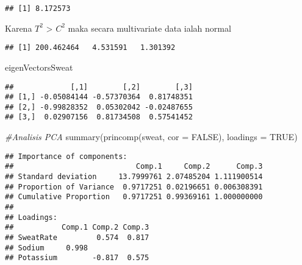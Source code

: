 \documentclass[
]{article}
\newenvironment{Shaded}{\begin{snugshade}}{\end{snugshade}}
\newcommand{\AttributeTok}[1]{\textcolor[rgb]{0.77,0.63,0.00}{#1}}
\newcommand{\CommentTok}[1]{\textcolor[rgb]{0.56,0.35,0.01}{\textit{#1}}}
\newcommand{\ConstantTok}[1]{\textcolor[rgb]{0.00,0.00,0.00}{#1}}
\newcommand{\FunctionTok}[1]{\textcolor[rgb]{0.00,0.00,0.00}{#1}}
\newcommand{\NormalTok}[1]{#1}
\newcommand{\OtherTok}[1]{\textcolor[rgb]{0.56,0.35,0.01}{#1}}
\newcommand{\SpecialCharTok}[1]{\textcolor[rgb]{0.00,0.00,0.00}{#1}}
\begin{document}
\begin{verbatim}
## [1] 8.172573
\end{verbatim}

Karena \(T^{2}\) \textgreater{} \(C^{2}\) maka secara multivariate data
ialah normal

\begin{Shaded}
\end{Shaded}

\begin{verbatim}
## [1] 200.462464   4.531591   1.301392
\end{verbatim}

\begin{Shaded}
\begin{Highlighting}[]
\NormalTok{eigenVectorsSweat}
\end{Highlighting}
\end{Shaded}

\begin{verbatim}
##             [,1]        [,2]        [,3]
## [1,] -0.05084144 -0.57370364  0.81748351
## [2,] -0.99828352  0.05302042 -0.02487655
## [3,]  0.02907156  0.81734508  0.57541452
\end{verbatim}

\begin{Shaded}
\begin{Highlighting}[]
\CommentTok{\#Analisis PCA}
\FunctionTok{summary}\NormalTok{(}\FunctionTok{princomp}\NormalTok{(sweat, }\AttributeTok{cor =} \ConstantTok{FALSE}\NormalTok{), }\AttributeTok{loadings =} \ConstantTok{TRUE}\NormalTok{)}
\end{Highlighting}
\end{Shaded}

\begin{verbatim}
## Importance of components:
##                            Comp.1     Comp.2      Comp.3
## Standard deviation     13.7999761 2.07485204 1.111900514
## Proportion of Variance  0.9717251 0.02196651 0.006308391
## Cumulative Proportion   0.9717251 0.99369161 1.000000000
## 
## Loadings:
##           Comp.1 Comp.2 Comp.3
## SweatRate         0.574  0.817
## Sodium     0.998              
## Potassium        -0.817  0.575
\end{verbatim}
\end{document}
